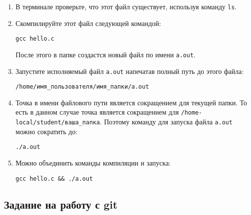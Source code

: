 \documentclass{article}
\begin{document}
\begin{enumerate}
\item В терминале проверьте, что этот файл существует, используя команду \texttt{ls}.
\item Скомпилируйте этот файл следующей командой:
\begin{verbatim}
gcc hello.c
\end{verbatim}
После этого в папке создастся новый файл по имени \texttt{a.out}.
\item Запустите исполняемый файл \texttt{a.out} напечатав полный путь до этого файла:
\begin{verbatim}
/home/имя_пользователя/имя_папки/a.out
\end{verbatim}
\item Точка в имени файлового пути является сокращением для текущей папки. То есть в данном случае точка является сокращением для \texttt{/home-local/student/ваша\_папка}. Поэтому команду для запуска файла \texttt{a.out} можно сократить до:
\begin{verbatim}
./a.out
\end{verbatim}
\item Можно объединить команды компиляции и запуска:
\begin{verbatim}
gcc hello.c && ./a.out
\end{verbatim}

\end{enumerate}

\newpage
\subsection*{Задание на работу с git}
\end{document}
